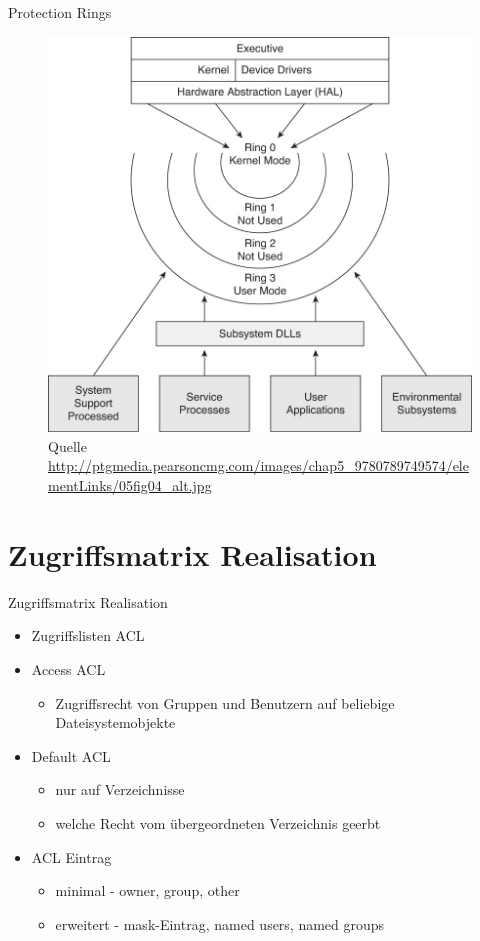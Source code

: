 \documentclass[ucs,9pt]{beamer}
\begin{document}
\begin{frame}{Protection Rings}
\begin{figure}
\includegraphics[scale=0.3]{protectionRings}
\caption{Quelle \url{http://ptgmedia.pearsoncmg.com/images/chap5_9780789749574/elementLinks/05fig04_alt.jpg}}
\end{figure}
\end{frame}

\section{Zugriffsmatrix Realisation}

\begin{frame}{Zugriffsmatrix Realisation}
\begin{itemize}
\item Zugriffslisten ACL
\item Access ACL
	\begin{itemize}
		\item Zugriffsrecht von Gruppen und Benutzern auf beliebige Dateisystemobjekte
	\end{itemize}
\item Default ACL
	\begin{itemize}
		\item nur auf Verzeichnisse
		\item welche Recht vom übergeordneten Verzeichnis geerbt
	\end{itemize}
\item ACL Eintrag
	\begin{itemize}
		\item minimal - owner, group, other
		\item erweitert - mask-Eintrag, named users, named groups
	\end{itemize}
\end{itemize}
\end{frame}
\end{document}
